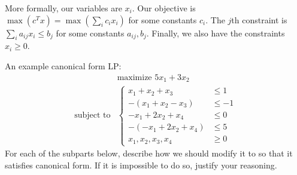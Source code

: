 \documentclass{article}
\begin{document}
More formally, our variables are $x_{i}$. Our objective is $\max(c^{T}x) = \max(\sum_{i} c_{i}x_{i})$ for some constants $c_{i}$. The $j$th constraint is $\sum_{i} a_{ij}x_{i} \leq b_{j}$ for some constants $a_{ij}, b_{j}$. Finally, we also have the constraints $x_{i} \geq 0$.

An example canonical form LP:
    \begin{align*}
                          &\text{maximize } 5x_{1} + 3x_{2}  \\
        \text{subject to} &\begin{cases}
            x_{1} + x_{2} + x_{3} &\leq 1 \\
            -(x_{1} + x_{2} - x_{3}) &\leq -1 \\
            -x_{1} + 2x_{2} + x_{4} &\leq 0 \\
            -(-x_{1} + 2x_{2} + x_{4}) &\leq 5 \\
            x_{1}, x_{2}, x_{3}, x_{4} &\geq 0   
        \end{cases}                      
    \end{align*}
For each of the subparts below, describe how we should modify it to so that it satisfies canonical form. If it is impossible to do so, justify your reasoning.
\end{document}
